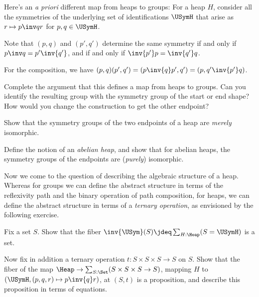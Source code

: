 Here's an \emph{a priori} different map from heaps to groups:
For a heap $H$, consider all the
symmetries of the underlying set of identifications $\USymH$
that arise as $r \mapsto p\inv q r$ for $p,q\in \USymH$.

Note that $(p,q)$ and $(p',q')$ determine the same symmetry
if and only if $p\inv q = p'\inv{q'}$, and if and only if
$\inv{p'}p = \inv{q'}q$.

For the composition, we have $(p,q)(p',q') = (p\inv{q}p',q') = (p,q'\inv{p'}q)$.

\begin{exercise}
  Complete the argument that this defines a map
  from heaps to groups. Can you identify the resulting group
  with the symmetry group of the start or end shape?
  How would you change the construction to get the other endpoint?
\end{exercise}

\begin{exercise}
  Show that the symmetry groups of the two endpoints of a heap
  are \emph{merely} isomorphic.

  Define the notion of an \emph{abelian heap},
  and show that for abelian heaps,
  the symmetry groups of the endpoints are (\emph{purely}) isomorphic.
\end{exercise}

Now we come to the question of describing the algebraic structure
of a heap.
Whereas for groups we can define the abstract structure
in terms of the reflexivity path and the binary operation of path composition,
for heaps, we can define the abstract structure
in terms of a \emph{ternary operation},
as envisioned by the following exercise.

\begin{exercise}\label{xca:heap-variety}
  Fix a set $S$.
  Show that the fiber $\inv{\USym}(S)\jdeq\sum_{H:\Heap}(S=\USymH)$ is a set.

  Now fix in addition a ternary operation $t:S\times S\times S\to S$ on $S$.
  Show that the fiber of the map $\Heap \to \sum_{S:\Set}(S\times S\times S \to S)$,
  mapping $H$ to $(\USymH,(p,q,r)\mapsto p \inv{q} r)$,
  at $(S,t)$ is a proposition,
  and describe this proposition in terms of equations.
\end{exercise}


